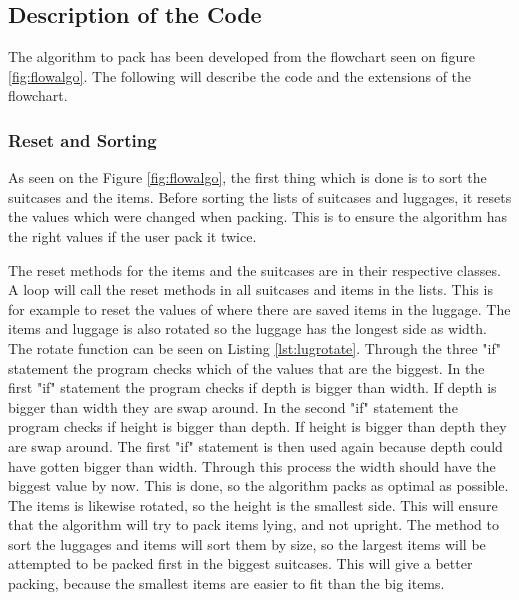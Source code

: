\subsection{Description of the Code}
The algorithm to pack has been developed from the flowchart seen on figure \ref{fig:flowalgo}. The following will describe the code and the extensions of the flowchart.
\subsubsection{Reset and Sorting}
As seen on the Figure \ref{fig:flowalgo}, the first thing which is done is to sort the suitcases and the items. Before sorting the lists of suitcases and luggages, it resets the values which were changed when packing. This is to ensure the algorithm has the right values if the user pack it twice.

The reset methods for the items and the suitcases are in their respective classes. A loop will call the reset methods in all suitcases and items in the lists. This is for example to reset the values of where there are saved items in the luggage. The items and luggage is also rotated so the luggage has the longest side as width. The rotate function can be seen on Listing \ref{lst:lugrotate}. Through the three "if" statement the program checks which of the values that are the biggest.
In the first "if" statement the program checks if depth is bigger than width. If depth is bigger than width they are swap around. In the second "if" statement the program checks if height is bigger than depth. If height is bigger than depth they are swap around. The first "if" statement is then used again because depth could have gotten bigger than width. Through this process the width should have the biggest value by now.
This is done, so the algorithm packs as optimal as possible. The items is likewise rotated, so the height is the smallest side. This will ensure that the algorithm will try to pack items lying, and not upright.
The method to sort the luggages and items will sort them by size, so the largest items will be attempted to be packed first in the biggest suitcases. This will give a better packing, because the smallest items are easier to fit than the big items.
